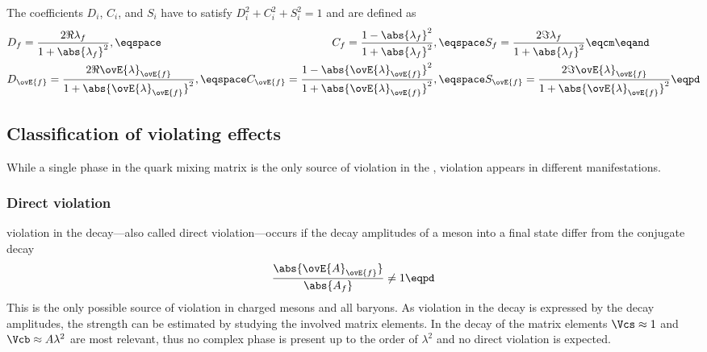 The \CP coefficients $D_i$, $C_i$, and $S_i$ have to satisfy $D_i^2 + C_i^2 +
S_i^2 = 1$ and are defined as
%
\begin{equation}\label{eq:cpv_theory:flavour_physics:time_evolution:cp_coefficients}
  \begin{alignedat}{2}
    &D_f = \frac{2 \Re \lambda_f}      {1+\abs{\lambda_f}^2},   \eqspace 
    &C_f = \frac{1 - \abs{\lambda_f}^2}{1 + \abs{\lambda_f}^2}, \eqspace 
    &S_f = \frac{2 \Im \lambda_f}      {1+\abs{\lambda_f}^2}    \eqcm \eqand \\
    &D_{\ovE{f}} = \frac{2 \Re \ovE{\lambda}_{\ovE{f}}}      {1+\abs{\ovE{\lambda}_{\ovE{f}}}^2},   \eqspace 
    &C_{\ovE{f}} = \frac{1 - \abs{\ovE{\lambda}_{\ovE{f}}}^2}{1 + \abs{\ovE{\lambda}_{\ovE{f}}}^2}, \eqspace 
    &S_{\ovE{f}} = \frac{2 \Im \ovE{\lambda}_{\ovE{f}}}      {1+\abs{\ovE{\lambda}_{\ovE{f}}}^2}    \eqpd \\
  \end{alignedat}
\end{equation}
%

\subsection[
  head={Classification of \CP violating effects},
  tocentry={Classification of \CPHyperref violating effects}
]{Classification of \CPbfsf violating effects}
\label{sec:cpv_theory:flavour_physics:cpv_classification}

While a single phase in the \CKM quark mixing matrix is the only source of \CP
violation in the \SM, \CP violation appears in different manifestations.

\subsubsection[Direct \CP violation]{Direct \CPbfsf violation}
\label{sec:cpv_theory:flavour_physics:cpv_classification:direct}

\CP violation in the decay---also called direct \CP violation---occurs if the
decay amplitudes of a meson into a final state differ from the \CP conjugate
decay
%
\begin{equation}
  \frac{\abs{\ovE{A}_{\ovE{f}}}}{\abs{A_f}} \neq 1 \eqpd
\end{equation}
%
This is the only possible source of \CP violation in charged mesons and all
baryons. As \CP violation in the decay is expressed by the decay amplitudes, the
strength can be estimated by studying the involved \CKM matrix elements. In the
decay of \BdToJpsiKS the matrix elements $\Vcs \approx 1$ and $\Vcb
\approx A\lambda^2$ are most relevant, thus no complex phase is present up to
the order of $\lambda^2$ and no direct \CP violation is expected.

